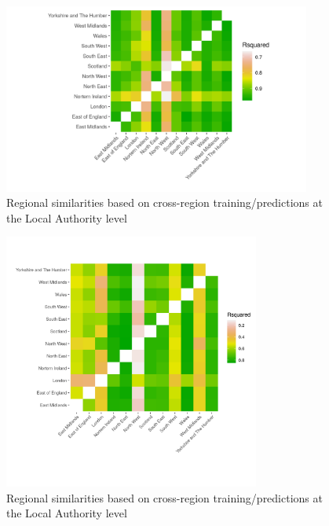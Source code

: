 \documentclass[11pt]{article}
\begin{document}
\begin{figure}[h]
    \centering
    \includegraphics[width=0.9\textwidth]{heatmap_LA}
    \caption{Regional similarities based on cross-region training/predictions at the Local Authority level}
    \label{fig:la}
\end{figure}

\begin{figure}[h]
    \centering
    \includegraphics[width=0.75\textwidth]{heatmap_OA}
    \caption{Regional similarities based on cross-region training/predictions at the Local Authority level}
    \label{fig:oa}
\end{figure}

%
\end{document}
